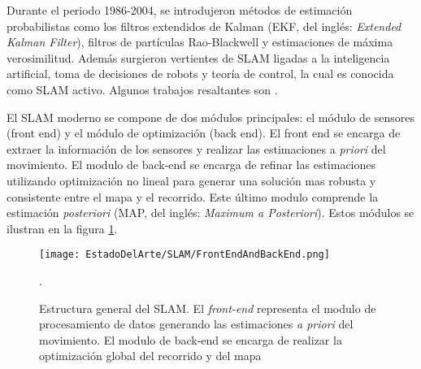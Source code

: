 Durante el periodo 1986-2004, se introdujeron métodos de estimación probabilistas  como los filtros extendidos de Kalman (EKF, del inglés: \textit{Extended Kalman Filter}), filtros de partículas Rao-Blackwell y estimaciones de máxima verosimilitud. Además surgieron vertientes de SLAM ligadas a la inteligencia artificial, toma de decisiones de robots y teoría de control, la cual es conocida como SLAM activo. Algunos trabajos resaltantes son \cite{Feder, Smith, Makarenko, Stachniss}.

El SLAM moderno se compone de dos módulos principales: el módulo de sensores (front end) y el módulo de optimización (back end). El front end se encarga de extraer la información de los sensores y realizar las estimaciones a \textit{priori} del movimiento. El modulo de back-end se encarga de refinar las estimaciones utilizando optimización no lineal para generar una solución mas robusta y consistente entre el mapa y el recorrido. Este último modulo comprende la estimación \textit{posteriori} (MAP, del inglés: \textit{Maximum a Posteriori}). Estos módulos se ilustran en la figura \ref{fig:SLAMStruct}.

\begin{figure}[H]
	\centering
	\texttt{[image: EstadoDelArte/SLAM/FrontEndAndBackEnd.png]}
	\caption[Estructura general del SLAM]{Estructura general del SLAM. El \textit{front-end} representa el modulo de procesamiento de datos generando las estimaciones \textit{a priori} del movimiento. El modulo de back-end se encarga de realizar la optimización global del recorrido y del mapa \cite{Cadena}}.
	\label{fig:SLAMStruct}
\end{figure}



